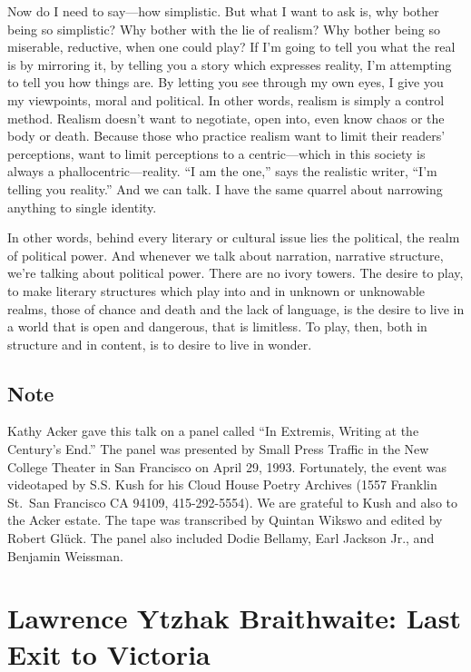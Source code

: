 \documentclass[
]{memoir}
\begin{document}
Now do I need to say---how simplistic. But what I want to ask is, why
bother being so simplistic? Why bother with the lie of realism? Why
bother being so miserable, reductive, when one could play? If I'm going
to tell you what the real is by mirroring it, by telling you a story
which expresses reality, I'm attempting to tell you how things are. By
letting you see through my own eyes, I give you my viewpoints, moral and
political. In other words, realism is simply a control method. Realism
doesn't want to negotiate, open into, even know chaos or the body or
death. Because those who practice realism want to limit their readers'
perceptions, want to limit perceptions to a centric---which in this
society is always a phallocentric---reality. ``I am the one,'' says the
realistic writer, ``I'm telling you reality.'' And we can talk. I have
the same quarrel about narrowing anything to single identity.

In other words, behind every literary or cultural issue lies the
political, the realm of political power. And whenever we talk about
narration, narrative structure, we're talking about political power.
There are no ivory towers. The desire to play, to make literary
structures which play into and in unknown or unknowable realms, those of
chance and death and the lack of language, is the desire to live in a
world that is open and dangerous, that is limitless. To play, then, both
in structure and in content, is to desire to live in wonder.

\hypertarget{note}{%
\section*{Note}\label{note}}

Kathy Acker gave this talk on a panel called ``In Extremis, Writing at
the Century's End.'' The panel was presented by Small Press Traffic in
the New College Theater in San Francisco on April 29, 1993. Fortunately,
the event was videotaped by S.S. Kush for his Cloud House Poetry
Archives (1557 Franklin St.~San Francisco CA 94109, 415-292-5554). We
are grateful to Kush and also to the Acker estate. The tape was
transcribed by Quintan Wikswo and edited by Robert Glück. The panel also
included Dodie Bellamy, Earl Jackson Jr., and Benjamin Weissman.

\hypertarget{lawrence-ytzhak-braithwaite-last-exit-to-victoria}{%
\chapter{Lawrence Ytzhak Braithwaite: Last Exit to
Victoria}\label{lawrence-ytzhak-braithwaite-last-exit-to-victoria}}
\end{document}
